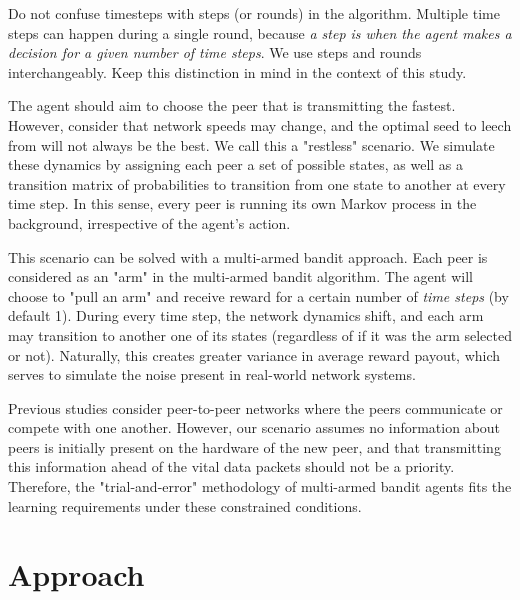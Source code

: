 \documentclass{article}
\begin{document}
\begin{center}
    Do not confuse timesteps with steps (or rounds) in the algorithm. Multiple time steps can happen during a single round, because \emph{a step is when the agent makes a 
decision for a given number of time steps}. We use steps and rounds interchangeably. Keep this distinction in mind in the context of this study.
\end{center}

The agent should aim to choose the peer that is transmitting the fastest. However, consider that network speeds may change, and the optimal seed to leech from will 
not always be the best. We call this a "restless" scenario. We simulate these dynamics by assigning each peer a set of possible states, as well as a transition matrix 
of probabilities to transition from one state to another at every time step. In this sense, every peer is running its own Markov process in the background, irrespective 
of the agent's action.

This scenario can be solved with a multi-armed bandit approach. Each peer is considered as an "arm" in the multi-armed bandit algorithm. The agent will choose to 
"pull an arm" and receive reward for a certain number of \emph{time steps} (by default 1). During every time step, the network dynamics shift, and each arm may 
transition to another one of its states (regardless of if it was the arm selected or not). Naturally, this creates greater variance in average reward payout, which 
serves to simulate the noise present in real-world network systems. 

Previous studies \cite{multiuser_mab,gossip_based_distrivuted_stochastic,p2p_offloading_with_delayed_feedback} consider peer-to-peer networks where the peers communicate 
or compete with one another. However, our scenario assumes no information about peers is initially present on the hardware of the new peer, and that transmitting this 
information ahead of the vital data packets should not be a priority. Therefore, the "trial-and-error" methodology of multi-armed bandit agents fits the learning 
requirements under these constrained conditions.


\section{Approach}
\end{document}
